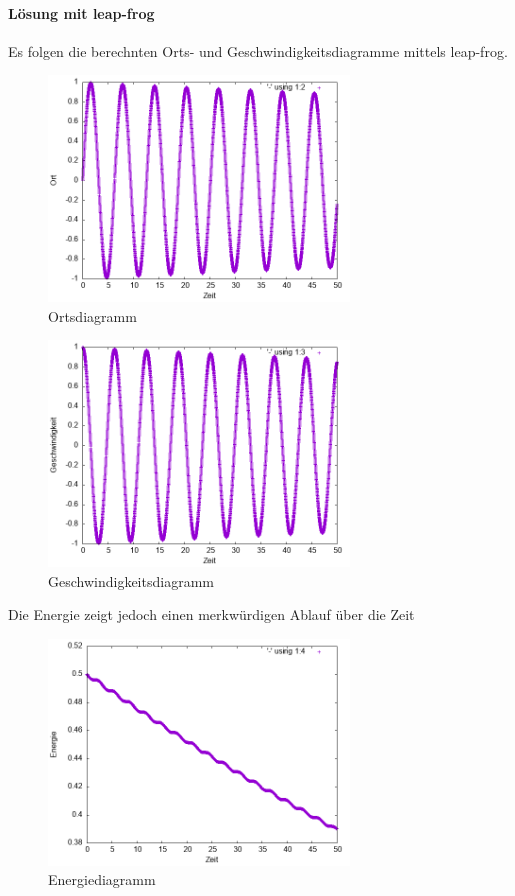 \documentclass[
    oneside,
    ngerman,
    footinclude=false,
    captions=tableheading,
    DIV=12
]{scrartcl}
\begin{document}
        \paragraph*{Lösung mit leap-frog}
            Es folgen die berechnten Orts- und Geschwindigkeitsdiagramme mittels leap-frog.
                \begin{figure}[H]
                    \centering
                    \includegraphics[width=8cm]{Bilddateien/LFA1a-001-x.png}
                    \caption{Ortsdiagramm}
                \end{figure}
                \begin{figure}[H]
                    \centering
                    \includegraphics[width=8cm]{Bilddateien/LFA1a-001-v.png}
                    \caption{Geschwindigkeitsdiagramm}
                \end{figure}
            Die Energie zeigt jedoch einen merkwürdigen Ablauf über die Zeit
                \begin{figure}[H]
                    \centering
                    \includegraphics[width=8cm]{Bilddateien/LFA1a-001-E.png}
                    \caption{Energiediagramm}
                \end{figure}
\end{document}
